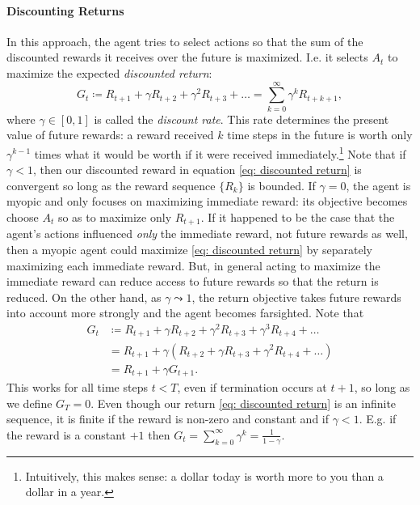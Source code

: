 \documentclass[12pt]{article}
\begin{document}
\paragraph{Discounting Returns} In this approach, the agent tries to select actions so that the sum of the discounted rewards it receives over the future is maximized. I.e. it selects $A_t$ to maximize the expected \emph{discounted   return}:
\begin{equation}
  \label{eq: discounted return}
  G_t \coloneqq R_{t+1} + \gamma R_{t+2} + \gamma^2 R_{t+3} + \ldots = \sum_{k=0}^{\infty} \gamma^k R_{t+k+1},
\end{equation}
where $\gamma \in [0,1]$ is called the \emph{discount rate}. This rate determines the present value of future rewards: a reward received $k$ time steps in the future is worth only $\gamma^{k-1}$ times what it would be worth if it were received immediately.\footnote{Intuitively, this makes sense: a dollar today is worth more to you than a dollar in a year.} Note that if $\gamma < 1$, then our discounted reward in equation \ref{eq: discounted return} is convergent so long as the reward sequence $\{R_k\}$ is bounded. If $\gamma = 0$, the agent is myopic and only focuses on maximizing immediate reward: its objective becomes choose $A_t$ so as to maximize only $R_{t+1}$. If it happened to be the case that the agent's actions influenced \emph{only} the immediate reward, not future rewards as well, then a myopic agent could maximize \ref{eq: discounted return} by separately maximizing each immediate reward.  But, in general acting to maximize the immediate reward can reduce access to future rewards so that the return is reduced. On the other hand, as $\gamma \leadsto 1$, the return objective takes future rewards into account more strongly and the agent becomes farsighted. Note that
\begin{align}
  G_t &\coloneqq R_{t+1} + \gamma R_{t+2} + \gamma^2 R_{t+3} + \gamma^3 R_{t+4}         + \ldots \nonumber \\
      &= R_{t+1} + \gamma \left(R_{t+2} + \gamma R_{t+3} + \gamma^2 R_{t+4} +                 \ldots \right) \nonumber \\
  \label{eq: recursivereturnformulation}
      &= R_{t+1} + \gamma G_{t+1}.
\end{align}
This works for all time steps $t<T$, even if termination occurs at $t+1$, so long as we define $G_T = 0$. Even though our return \ref{eq: discounted return}
is an infinite sequence, it is finite if the reward is non-zero and constant and if $\gamma < 1$. E.g. if the reward is a constant $+1$ then $G_t = \sum_{k=0}^{\infty} \gamma^k = \frac{1}{1-\gamma}$.
\end{document}
